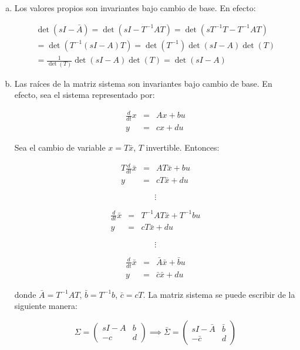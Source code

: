\begin{enumerate}[i)]
\begin{enumerate}[a)]
\item Los valores propios son invariantes bajo cambio de base. En efecto:

\begin{multline}
\det{(sI - \bar{A})} = \det{(sI - T^{-1} A T)} = \det{(s T^{-1} T - T^{-1} A T)} \\
= \det{(T^{-1} (sI - A) T)} = \det{(T^{-1})} \det{(sI - A)} \det{(T)} \\
= \frac{1}{\det{(T)}} \det{(sI - A)} \det{(T)} = \det{(sI - A)} \nonumber
\end{multline}

\item Las raíces de la matriz sistema son invariantes bajo cambio de base. En efecto, sea el sistema representado por:

\begin{eqnarray}
\frac{d}{dt} x & = & A x + b u \nonumber \\
y & = & c x + d u \nonumber
\end{eqnarray}

Sea el cambio de variable $x = T \bar{x}$, $T$ invertible. Entonces:

\begin{eqnarray}
T \frac{d}{dt} \bar{x} & = & A T \bar{x} + b u \nonumber \\
y & = & c T \bar{x} + d u \nonumber
\end{eqnarray}

\begin{equation}
\vdots \nonumber
\end{equation}

\begin{eqnarray}
\frac{d}{dt} \bar{x} & = & T^{-1} A T \bar{x} + T^{-1} b u \nonumber \\
y & = & c T \bar{x} + d u \nonumber
\end{eqnarray}

\begin{equation}
\vdots \nonumber
\end{equation}

\begin{eqnarray}
\frac{d}{dt} \bar{x} & = & \bar{A} \bar{x} + \bar{b} u \nonumber \\
y & = & \bar{c} \bar{x} + d u
\end{eqnarray}

donde $\bar{A} = T^{-1} A T$, $\bar{b} = T^{-1} b$, $\bar{c} = c T$. La matriz sistema se puede escribir de la siguiente manera:

\begin{equation}
\Sigma =
\begin{pmatrix}
sI - A & b \\
-c & d
\end{pmatrix}
\implies
\bar{\Sigma} =
\begin{pmatrix}
sI - \bar{A} & \bar{b} \\
-\bar{c} & d
\end{pmatrix}
\end{equation}


\end{enumerate}
\end{enumerate}
